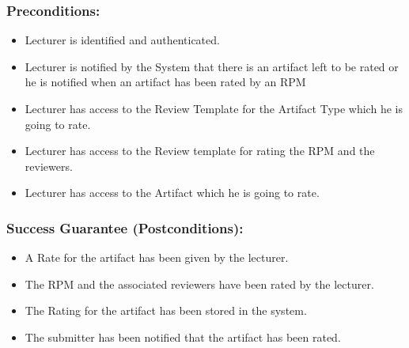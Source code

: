     \subsubsection*{\textbf{Preconditions:}}
    \begin{itemize}
    \itemsep-1em 
        \item Lecturer is identified and authenticated.
        \item Lecturer is notified by the System that there is an artifact left to be rated or he is notified when an artifact has been rated by an RPM
         \item Lecturer has access to the Review Template for the Artifact Type which he is going to rate.
        \item Lecturer has access to the Review template for rating the RPM and the reviewers.
        \item Lecturer has access to the Artifact which he is going to rate.
    \end{itemize}


    
    
    
    \subsubsection*{Success Guarantee (Postconditions):}
    \begin{itemize}
    \itemsep-1em 
       \item A Rate for the artifact has been given by the lecturer.
       \item The RPM and the associated reviewers have been rated by the lecturer.
\item The Rating for the artifact has been stored in the system.
\item The submitter has been notified that the artifact has been rated.
    \end{itemize}
    
    
    
